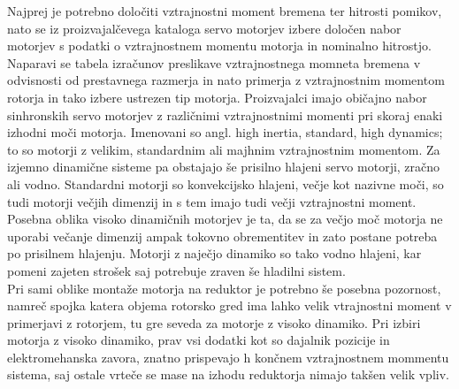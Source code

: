 \documentclass[a4paper,twoside,openright,12pt]{book}
\begin{document}
Najprej je potrebno določiti vztrajnostni moment bremena ter hitrosti pomikov, nato se iz proizvajalčevega kataloga servo motorjev izbere določen nabor motorjev s podatki o vztrajnostnem momentu motorja in nominalno hitrostjo. Naparavi se tabela izračunov preslikave vztrajnostnega momneta bremena v odvisnosti od prestavnega razmerja in nato primerja z vztrajnostnim momentom rotorja in tako izbere ustrezen tip motorja. Proizvajalci imajo običajno nabor sinhronskih servo motorjev z različnimi vztrajnostnimi momenti pri skoraj enaki izhodni moči motorja. Imenovani so angl. high inertia, standard, high dynamics; to so motorji z velikim, standardnim ali majhnim vztrajnostnim momentom. Za izjemno dinamične sisteme pa obstajajo še prisilno hlajeni servo motorji, zračno ali vodno. Standardni motorji so konvekcijsko hlajeni, večje kot nazivne moči, so tudi motorji večjih dimenzij in s tem imajo tudi večji vztrajnostni moment. Posebna oblika visoko dinamičnih motorjev je ta, da se za večjo moč motorja ne uporabi večanje dimenzij ampak tokovno obrementitev in zato postane potreba po prisilnem hlajenju. Motorji z naječjo dinamiko so tako vodno hlajeni, kar pomeni zajeten strošek saj potrebuje zraven še hladilni sistem.\\   
Pri sami oblike montaže motorja na reduktor je potrebno še posebna pozornost, namreč spojka katera objema rotorsko gred ima lahko velik vtrajnostni moment v primerjavi z rotorjem, tu gre seveda za motorje z visoko dinamiko. Pri izbiri motorja z visoko dinamiko, prav vsi dodatki kot so dajalnik pozicije in elektromehanska zavora, znatno prispevajo h končnem vztrajnostnem mommentu sistema, saj ostale vrteče se mase na izhodu reduktorja nimajo takšen velik vpliv. 
\end{document}
